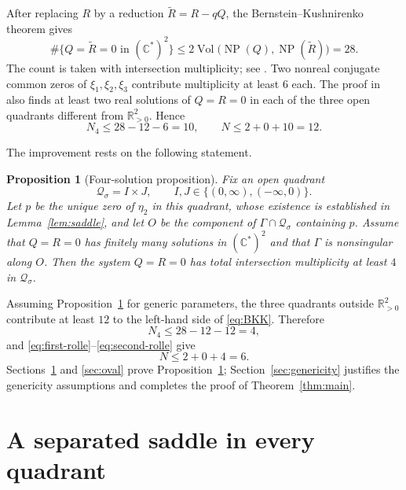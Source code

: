 \documentclass[10pt,reqno]{amsart}
\numberwithin{equation}{section}
\theoremstyle{plain}
\newtheorem{proposition}[theorem]{Proposition}
\theoremstyle{remark}
\newcommand{\R}{\mathbb{R}}
\newcommand{\C}{\mathbb{C}}
\newcommand{\NP}{\operatorname{NP}}
\newcommand{\Vol}{\operatorname{Vol}}
\newcommand{\Qpos}{\R_{>0}^{2}}
\begin{document}
After replacing $R$ by a reduction $\widetilde R=R-qQ$, the
Bernstein--Kushnirenko theorem gives
\begin{equation}\label{eq:BKK}
  \#\{Q=\widetilde R=0\text{ in }(\C^*)^2\}
  \leq
  2\Vol\bigl(\NP(Q),\NP(\widetilde R)\bigr)
  =28.
\end{equation}
The count is taken with intersection multiplicity; see
\cite{Bernstein,GNS}.  Two nonreal conjugate common zeros of
$\xi_1,\xi_2,\xi_3$ contribute multiplicity at least $6$ each.  The proof
in \cite{GNS} also finds at least two real solutions of $Q=R=0$ in each
of the three open quadrants different from $\Qpos$.  Hence
\begin{equation}\label{eq:old-bound}
  N_4\leq28-12-6=10,
  \qquad
  N\leq2+0+10=12.
\end{equation}

The improvement rests on the following statement.

\begin{proposition}[Four-solution proposition]\label{prop:four-solutions}
Fix an open quadrant
\[
  \mathcal Q_{\sigma}=I\times J,
  \qquad
  I,J\in\{(0,\infty),(-\infty,0)\}.
\]
Let $p$ be the unique zero of $\eta_2$ in this quadrant, whose existence
is established in Lemma~\ref{lem:saddle}, and let $O$ be the component of
$\Gamma\cap\mathcal Q_{\sigma}$ containing $p$.  Assume that $Q=R=0$
has finitely many solutions in $(\C^*)^2$ and that $\Gamma$ is
nonsingular along $O$.  Then the system $Q=R=0$ has total intersection
multiplicity at least $4$ in $\mathcal Q_{\sigma}$.
\end{proposition}

Assuming Proposition~\ref{prop:four-solutions} for generic parameters,
the three quadrants outside $\Qpos$ contribute at least $12$ to the
left-hand side of \eqref{eq:BKK}.  Therefore
\begin{equation}\label{eq:new-N4}
  N_4\leq28-12-12=4,
\end{equation}
and \eqref{eq:first-rolle}--\eqref{eq:second-rolle} give
\begin{equation}\label{eq:generic-six}
  N\leq2+0+4=6.
\end{equation}
Sections~\ref{sec:saddle} and \ref{sec:oval} prove
Proposition~\ref{prop:four-solutions}; Section~\ref{sec:genericity}
justifies the genericity assumptions and completes the proof of
Theorem~\ref{thm:main}.

\section{A separated saddle in every quadrant}\label{sec:saddle}
\end{document}
